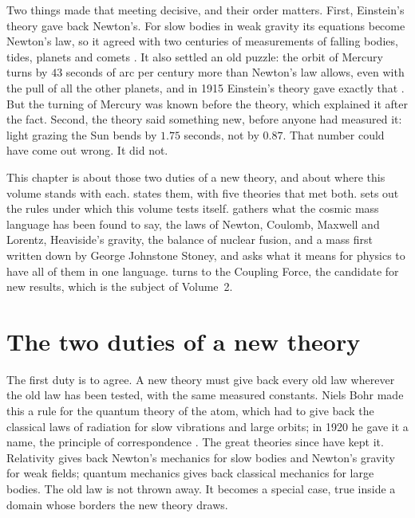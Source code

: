 Two things made that meeting decisive, and their order matters. First, Einstein's theory gave back Newton's. For slow bodies in weak gravity its equations become Newton's law, so it agreed with two centuries of measurements of falling bodies, tides, planets and comets \citep{Einstein1916}. It also settled an old puzzle: the orbit of Mercury turns by $43$ seconds of arc per century more than Newton's law allows, even with the pull of all the other planets, and in 1915 Einstein's theory gave exactly that \citep{Einstein1915}. But the turning of Mercury was known before the theory, which explained it after the fact. Second, the theory said something new, before anyone had measured it: light grazing the Sun bends by $1.75$ seconds, not by $0.87$. That number could have come out wrong. It did not.

\bigskip

This chapter is about those two duties of a new theory, and about where this volume stands with each.  states them, with five theories that met both.  sets out the rules under which this volume tests itself.  gathers what the cosmic mass language has been found to say, the laws of Newton, Coulomb, Maxwell and Lorentz, Heaviside's gravity, the balance of nuclear fusion, and a mass first written down by George Johnstone Stoney, and asks what it means for physics to have all of them in one language.  turns to the Coupling Force, the candidate for new results, which is the subject of Volume~2.

\section{The two duties of a new theory}\label{sec:al-duties}

The first duty is to agree. A new theory must give back every old law wherever the old law has been tested, with the same measured constants. Niels Bohr made this a rule for the quantum theory of the atom, which had to give back the classical laws of radiation for slow vibrations and large orbits; in 1920 he gave it a name, the principle of correspondence \citep{Bohr1920}. The great theories since have kept it. Relativity gives back Newton's mechanics for slow bodies and Newton's gravity for weak fields; quantum mechanics gives back classical mechanics for large bodies. The old law is not thrown away. It becomes a special case, true inside a domain whose borders the new theory draws.

